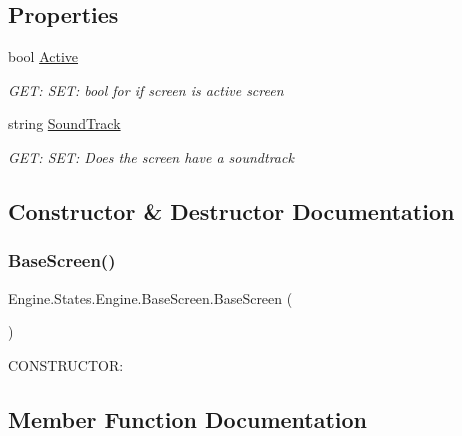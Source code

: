 \subsection*{Properties}
\begin{DoxyCompactItemize}
\item 
bool \hyperlink{a00550_ac5d310a291bb741ffd071372bc1ba496}{Active}
\begin{DoxyCompactList}\small\item\em G\+ET\+: S\+ET\+: bool for if screen is active screen \end{DoxyCompactList}\item 
string \hyperlink{a00550_af942c6eeee717dee53a460530f4efb3d}{Sound\+Track}
\begin{DoxyCompactList}\small\item\em G\+ET\+: S\+ET\+: Does the screen have a soundtrack \end{DoxyCompactList}\end{DoxyCompactItemize}


\subsection{Constructor \& Destructor Documentation}
\mbox{\label{a00550_af66e62ec831d9ac03c231265b808417f}} 
\subsubsection{\texorpdfstring{Base\+Screen()}{BaseScreen()}}
{\footnotesize\ttfamily Engine.\+States.\+Engine.\+Base\+Screen.\+Base\+Screen (\begin{DoxyParamCaption}{ }\end{DoxyParamCaption})\hspace{0.3cm}{\ttfamily [inline]}}



C\+O\+N\+S\+T\+R\+U\+C\+T\+OR\+: 



\subsection{Member Function Documentation}
\mbox{\label{a00550_a200c31954effe5fc060118607155fb16}} 
